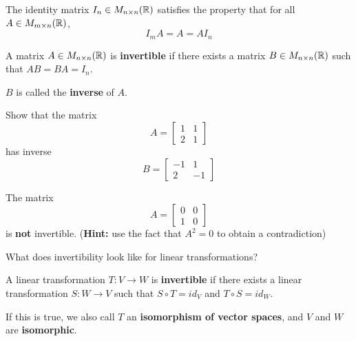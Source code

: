 \begin{proposition}
    The identity matrix $I_n \in M_{n \times n}(\mathbb{R})$ satisfies the property that for all $A \in M_{m \times n}(\mathbb{R})$, $$I_mA = A = AI_n$$
\end{proposition}













\begin{definition}
    A matrix $A\in M_{n \times n}(\mathbb{R})$ is \textbf{invertible} if there exists a matrix $B\in M_{n \times n}(\mathbb{R})$ such that $AB = BA = I_n$.
    
    $B$ is called the \textbf{inverse} of $A$.
    \end{definition}

\begin{example}
    Show that the matrix \begin{equation*}
A = 
\begin{bmatrix}
1 & 1 \\
2 & 1
\end{bmatrix}
\end{equation*}
has inverse \begin{equation*}
B = 
\begin{bmatrix}
-1 & 1 \\
2 & -1
\end{bmatrix}
\end{equation*}
\end{example}

\begin{example}
    The matrix  \begin{equation*}
A = 
\begin{bmatrix}
0 & 0 \\
1 & 0
\end{bmatrix}
\end{equation*} is \textbf{not} invertible. (\textbf{Hint:} use the fact that $A^2 = 0$ to obtain a contradiction)
\end{example}

\begin{motivating}
What does invertibility look like for linear transformations?
\end{motivating}

\begin{definition}
    A linear transformation $T: V \to W$ is \textbf{invertible} if there exists a linear transformation $S : W \to V$ such that $S \circ T = id_V$ and $T \circ S = id_W$.
    
    If this is true, we also call $T$ an \textbf{isomorphism of vector spaces}, and $V$ and $W$ are \textbf{isomorphic}.
    \end{definition}


